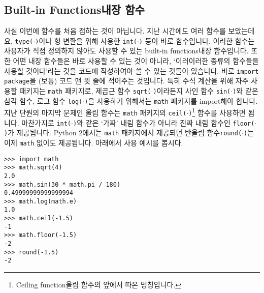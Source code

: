 \documentclass[../main.tex]{subfiles}
\begin{document}
\subsection{Built-in Functions내장 함수}
사실 이번에 함수를 처음 접하는 것이 아닙니다.  지난 시간에도 여러 함수를
보았는데요, \texttt{type($\cdot$)}이나 형 변환을 위해 사용한
\texttt{int($\cdot$)} 등이 바로 함수입니다.  이러한 함수는 사용자가 직접
정의하지 않아도 사용할 수 있는 built-in functions내장 함수입니다.  또한 어떤
내장 함수들은 바로 사용할 수 있는 것이 아니라, `이러이러한 종류의 함수들을
사용할 것이다'라는 것을 코드에 작성하여야 쓸 수 있는 것들이 있습니다.  바로
\texttt{import package}을 (보통) 코드 맨 윗 줄에 적어주는 것입니다.  특히
수식 계산을 위해 자주 사용할 패키지는 \texttt{math} 패키지로, 제곱근 함수
\texttt{sqrt($\cdot$)}이라든지 사인 함수 \texttt{sin($\cdot$)}와 같은 삼각
함수, 로그 함수 \texttt{log($\cdot$)}을 사용하기 위해서는  \texttt{math}
패키지를 import해야 합니다.  지난 단원의 마지막 문제인 올림 함수는 \verb|math|
패키지의 \texttt{ceil($\cdot$)}\footnote{Ceiling function올림 함수의 앞에서 따온
명칭입니다.} 함수를 사용하면 됩니다.  마찬가지로 \texttt{int($\cdot$)}와 같은
`가짜' 내림 함수가 아니라 진짜 내림 함수인 \texttt{floor($\cdot$)}가
제공됩니다.
Python 2에서는 \verb|math| 패키지에서 제공되던 반올림
함수\texttt{round($\cdot$)}는 이제 \verb|math| 없이도 제공됩니다.  아래에서
사용 예시를 봅시다.
\begin{verbatim}
>>> import math
>>> math.sqrt(4)
2.0
>>> math.sin(30 * math.pi / 180)
0.49999999999999994
>>> math.log(math.e)
1.0
>>> math.ceil(-1.5)
-1
>>> math.floor(-1.5)
-2
>>> round(-1.5)
-2
\end{verbatim}
\end{document}
